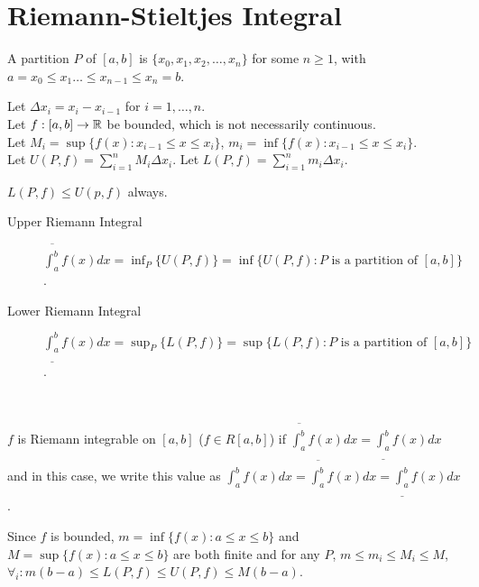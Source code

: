 \chapter{Riemann-Stieltjes Integral}
\begin{define}[Partition]
	A partition $P$ of $[a,b]$ is $\{x_0,x_1,x_2,\ldots ,x_{n}\}$ for some $n\ge 1$, with $a=x_0\le x_1 \ldots \le x_{n-1}\le x_{n}=b$.\\
\end{define}
Let $\Delta x_i=x_i-x_{i-1}$ for $i=1,\ldots ,n$.\\
Let $f: [a,b]\to \mathbb{R}$ be bounded, which is not necessarily continuous.\\
Let $M_i=\sup\{f(x):x_{i-1}\le x\le x_i\}$, $m_i=\inf\{f(x):x_{i-1}\le x\le x_i\}$.\\
Let $U(P,f)=\sum_{i=1}^{n}{M_i \Delta x_i}$.
Let $L(P,f)=\sum_{i=1}^{n}{m_{i}\Delta x_{i}}$.\\
\begin{note}
	$L(P,f)\le U(p,f)$ always.
\end{note}

\begin{define}
	\begin{description}
		\item[Upper Riemann Integral] $\overline{\int_{a}^{b}}f(x)dx=\inf_{P}\{ U(P,f)\}=\inf\{U(P,f):P\text{ is a partition of }[a,b]\}$.
		\item[Lower Riemann Integral] $\underline{\int_{a}^{b}}f(x)dx=\sup_{P}\{L(P,f)\} =\sup\{L(P,f):P\text{ is a partition of }[a,b]\}$.
	\end{description}\hfill\\
	\begin{remark}
		$f$ is Riemann integrable on $[a,b]$ ($f \in R[a,b]$) if $\overline{\int_{a}^{b}}f(x)dx=\underline{\int_{a}^{b}}f(x)dx$ and in this case, we write this value as $\int_{a}^{b}f(x)dx=\overline{\int_{a}^{b}}f(x)dx=\underline{\int_{a}^{b}}f(x)dx$.
	\end{remark}
	\begin{note}
		Since $f$ is bounded, $m=\inf\{f(x):a\le x\le b\}$ and $M=\sup\{f(x):a\le x\le b\}$ are both finite and for any $P$, $m\le m_i\le M_i\le M$, $\forall_{i}: m(b-a)\le L(P,f)\le U(P,f)\le M(b-a)$.
	\end{note}
\end{define}

